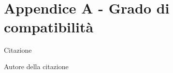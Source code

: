 
\chapter{Appendice A - Grado di compatibilità}
\label{cap:appA}

\epigraph{Citazione}{Autore della citazione}



